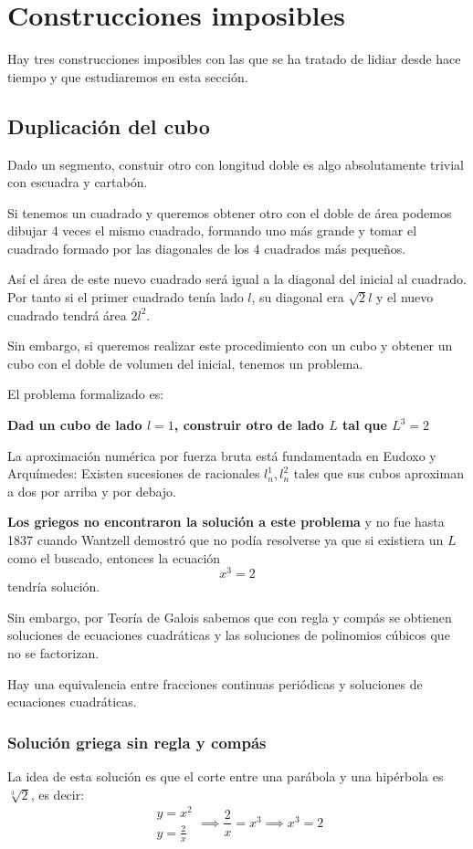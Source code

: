 \documentclass{apuntes}
\begin{document}
\section{Construcciones imposibles}
Hay tres construcciones imposibles con las que se ha tratado de lidiar desde hace tiempo y que estudiaremos en esta sección.

\subsection{Duplicación del cubo}

Dado un segmento, constuir otro con longitud doble es algo absolutamente trivial con escuadra y cartabón.

Si tenemos un cuadrado y queremos obtener otro con el doble de área podemos dibujar 4 veces el mismo cuadrado, formando uno más grande y tomar el cuadrado formado por las diagonales de los 4 cuadrados más pequeños.

Así el área de este nuevo cuadrado será igual a la diagonal del inicial al cuadrado. Por tanto si el primer cuadrado tenía lado $l$, su diagonal era $\sqrt{2}l$ y el nuevo cuadrado tendrá área $2l^2$.

Sin embargo, si queremos realizar este procedimiento con un cubo y obtener un cubo con el doble de volumen del inicial, tenemos un problema.

El problema formalizado es:

\textbf{Dad un cubo de lado $l=1$, construir otro de lado $L$ tal que $L^3=2$}

La aproximación numérica por fuerza bruta está fundamentada en Eudoxo y Arquímedes: Existen sucesiones de racionales $l_n^1,l_n^2$ tales que sus cubos aproximan a dos por arriba y por debajo.

\textbf{Los griegos no encontraron la solución a este problema} y no fue hasta 1837 cuando Wantzell demostró que no podía resolverse ya que si existiera un $L$ como el buscado, entonces la ecuación
\[x^3=2\]
tendría solución.

Sin embargo, por Teoría de Galois sabemos que con regla y compás se obtienen soluciones de ecuaciones cuadráticas y las soluciones de polinomios cúbicos que no se factorizan.

\obs Hay una equivalencia entre fracciones continuas periódicas y soluciones de ecuaciones cuadráticas.

\subsubsection{Solución griega sin regla y compás}
La idea de esta solución es que el corte entre una parábola y una hipérbola es $\sqrt[3]{2}$, es decir:
\[\begin{array}{l}y=x^2 \\ y=\frac{2}{x}\end{array} \implies \frac{2}{x} = x^3 \implies x^3 = 2\]
\end{document}
